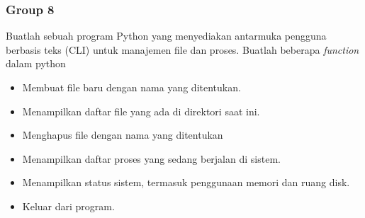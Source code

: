 \documentclass[12pt]{article}
\begin{document}
\subsubsection{Group 8}
Buatlah sebuah program Python yang menyediakan antarmuka pengguna berbasis teks (CLI) untuk manajemen file dan proses. Buatlah beberapa \textit{function} dalam python
\begin{itemize}
    \item Membuat file baru dengan nama yang ditentukan.
    \item Menampilkan daftar file yang ada di direktori saat ini.
    \item Menghapus file dengan nama yang ditentukan
    \item Menampilkan daftar proses yang sedang berjalan di sistem.
    \item Menampilkan status sistem, termasuk penggunaan memori dan ruang disk.
    \item Keluar dari program.
\end{itemize}
\end{document}
